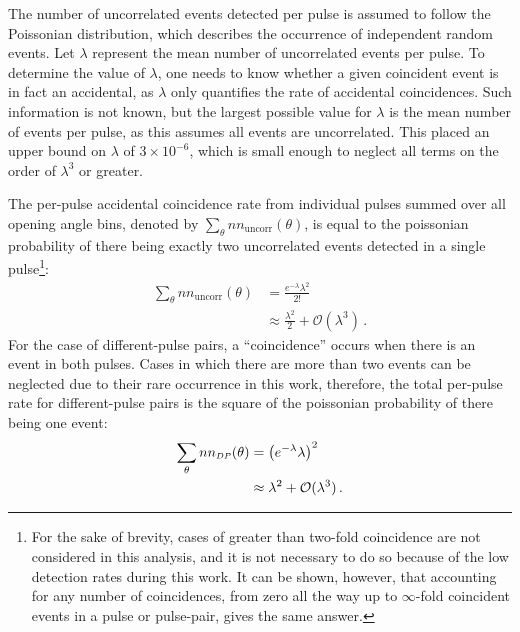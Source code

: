 The number of uncorrelated events detected per pulse is assumed to follow the Poissonian distribution, which describes the occurrence of independent random events.
Let $\lambda$ represent the mean number of uncorrelated events per pulse.
To determine the value of $\lambda$, one needs to know whether a given coincident event is in fact an accidental, as $\lambda$ only quantifies the rate of accidental coincidences.
Such information is not known, but the largest possible value for $\lambda$ is the mean number of events per pulse, as this assumes all events are uncorrelated.
This placed an upper bound on $\lambda$ of $3\times 10^{-6}$, which is small enough to neglect all terms on the order of $\lambda^3$ or greater.

The per-pulse accidental coincidence rate from individual pulses summed over all opening angle bins, denoted by $\sum_{\theta} nn_{\text{uncorr}}(\theta)$, is equal to the poissonian probability of there being exactly two uncorrelated events detected in a single pulse\footnote{For the sake of brevity, cases of greater than two-fold coincidence are not considered in this analysis, and it is not necessary to do so because of the low detection rates during this work.
It can be shown, however, that accounting for any number of coincidences, from zero all the way up to $\infty$-fold coincident events in a pulse or pulse-pair, gives the same answer.}:
\begin{equation} \label{math:SP}
    \begin{split}
    \sum_{\theta} nn_{\text{uncorr}}(\theta) & = \frac{e^{-\lambda}\lambda^{2}}{2!} \\
        &\approx \frac{\lambda^2}{{2}} + \mathcal{O}(\lambda^3) \, .
    \end{split}
\end{equation}
For the case of different-pulse pairs, a ``coincidence'' occurs when there is an event in both pulses.
Cases in which there are more than two events can be neglected due to their rare occurrence in this work, therefore, the total per-pulse rate for different-pulse pairs is the square of the poissonian probability of there being one event:
\begin{equation} \label{math:DP}
    \begin{split}
   \sum_{\theta} nn_{\scaleto{DP}{4pt}}(\theta)&= \left(e^{-\lambda}\lambda\right)^{2} \\
    &\approx \lambda^2 + \mathcal{O}(\lambda^3) \, .
    \end{split}
\end{equation}
